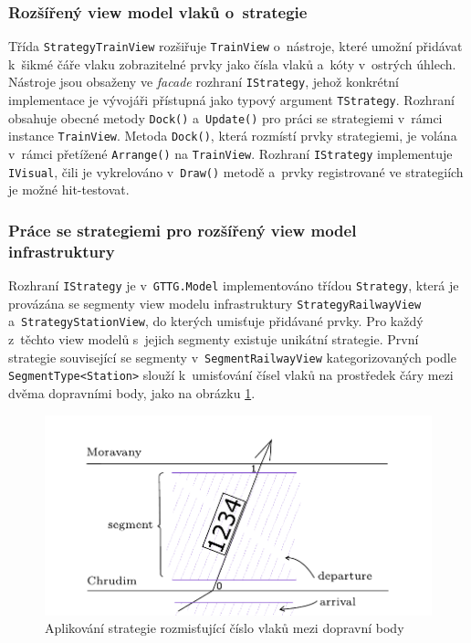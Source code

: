 \subsubsection*{Rozšířený view model vlaků o~strategie}
Třída \texttt{StrategyTrainView} rozšiřuje \texttt{TrainView} o~nástroje, které umožní přidávat k~šikmé čáře vlaku zobrazitelné prvky jako čísla vlaků a~kóty v~ostrých úhlech. Nástroje jsou obsaženy ve \textit{facade} rozhraní \texttt{IStrategy}, jehož konkrétní implementace je vývojáři přístupná jako typový argument \texttt{TStrategy}. Rozhraní obsahuje obecné metody \texttt{Dock()} a~\texttt{Update()} pro práci se strategiemi v~rámci instance \texttt{TrainView}. Metoda \texttt{Dock()}, která rozmístí prvky strategiemi, je volána v~rámci přetížené \texttt{Arrange()} na \texttt{TrainView}. Rozhraní \texttt{IStrategy} implementuje \texttt{IVisual}, čili je vykrelováno v~\texttt{Draw()} metodě a~prvky registrované ve strategiích je možné hit-testovat.

\subsubsection*{Práce se strategiemi pro rozšířený view model infrastruktury}
\label{kap4:strategy}
Rozhraní \texttt{IStrategy} je v~\texttt{GTTG.Model} implementováno třídou \texttt{Strategy}, která je provázána se segmenty view modelu infrastruktury \texttt{StrategyRailwayView} a~\texttt{StrategyStationView}, do kterých umisťuje přidávané prvky. Pro každý \linebreak z~těchto view modelů s~jejich segmenty existuje unikátní strategie. První strategie související se segmenty v~\texttt{SegmentRailwayView} kategorizovaných podle \linebreak\texttt{SegmentType<Station>} slouží k~umisťování čísel vlaků na prostředek čáry mezi dvěma dopravními body, jako na obrázku \ref{fig:kap4:gttg-model-train_number_strategy}.

\begin{figure}[!hbt]
	\centering
	\includegraphics[width=.7\textwidth]{../img/kap4_strategies}
	\caption{Aplikování strategie rozmisťující číslo vlaků mezi dopravní body}
	\label{fig:kap4:gttg-model-train_number_strategy}
\end{figure}

